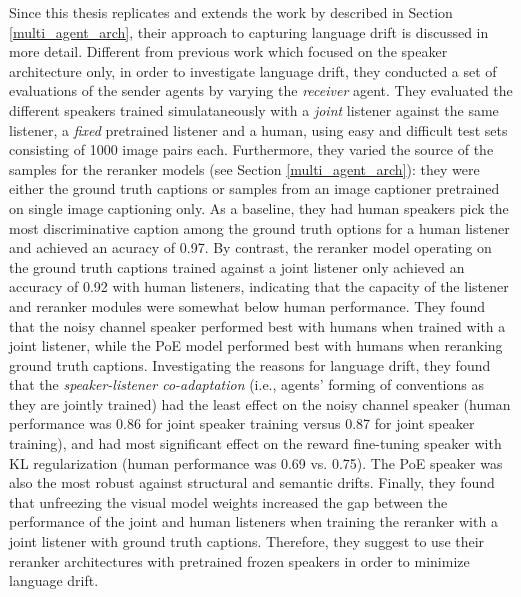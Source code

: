 Since this thesis replicates and extends the work by \cite{lazaridou2020multi} described in Section \ref{multi_agent_arch}, their approach to capturing language drift is discussed in more detail.
Different from previous work which focused on the speaker architecture only, in order to investigate language drift, they conducted a set of evaluations of the sender agents by varying the \emph{receiver} agent. They evaluated the different speakers trained simulataneously with a \textit{joint} listener against the same listener, a \textit{fixed} pretrained listener and a human, using easy and difficult test sets consisting of 1000 image pairs each. Furthermore, they varied the source of the samples for the reranker models (see Section \ref{multi_agent_arch}): they were either the ground truth captions or samples from an image captioner pretrained on single image captioning only. As a baseline, they had human speakers pick the most discriminative caption among the ground truth options for a human listener and achieved an acuracy of 0.97. By contrast, the reranker model operating on the ground truth captions trained against a joint listener only achieved an accuracy of 0.92 with human listeners, indicating that the capacity of the listener and reranker modules were somewhat below human performance. They found that the noisy channel speaker performed best with humans when trained with a joint listener, while the PoE model performed best with humans when reranking ground truth captions. Investigating the reasons for language drift, they found that the \emph{speaker-listener co-adaptation} (i.e., agents' forming of conventions as they are jointly trained) had the least effect on the noisy channel speaker (human performance was 0.86 for joint speaker training versus 0.87 for joint speaker training), and had most significant effect on the reward fine-tuning speaker with KL regularization (human performance was 0.69 vs. 0.75). The PoE speaker was also the most robust against structural and semantic drifts. Finally, they found that unfreezing the visual model weights increased the gap between the performance of the joint and human listeners when training the reranker with a joint listener with ground truth captions. Therefore, they suggest to use their reranker architectures with pretrained frozen speakers in order to minimize language drift.

